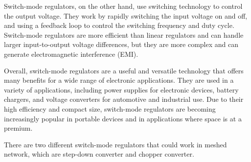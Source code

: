 Switch-mode regulators, on the other hand, use switching technology to control the output voltage. They work by rapidly switching the input voltage on and off, and using a feedback loop to control the switching frequency and duty cycle. Switch-mode regulators are more efficient than linear regulators and can handle larger input-to-output voltage differences, but they are more complex and can generate electromagnetic interference (EMI).

Overall, switch-mode regulators are a useful and versatile technology that offers many benefits for a wide range of electronic applications. They are used in a variety of applications, including power supplies for electronic devices, battery chargers, and voltage converters for automotive and industrial use. Due to their high efficiency and compact size, switch-mode regulators are becoming increasingly popular in portable devices and in applications where space is at a premium.

There are two different switch-mode regulators that could work in meshed network, which are step-down converter and chopper converter.



\begin{comment}

potentiaal sources
"Power Electronics: Converters, Applications, and Design" by Ned Mohan, Tore M. Undeland, William P. Robbins.
"Pulse Width Modulation for Power Converters: Principles and Practice" by Paul C. C. Hwang
"Switching Power Converters: Design and Analysis" by Khalid Sheikh.

\end{comment}